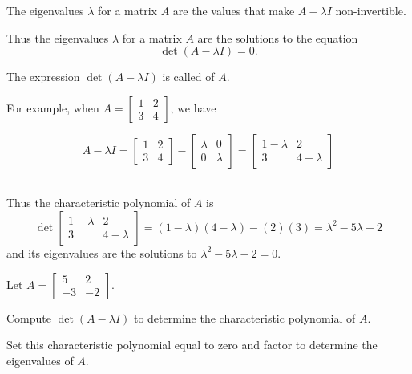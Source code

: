 \begin{fact}
  The eigenvalues \(\lambda\) for a matrix \(A\) are the values
  that make \(A-\lambda I\) non-invertible.

  \vspace{1em}

  Thus the eigenvalues \(\lambda\) for a matrix \(A\)
  are the solutions to
  the equation \[\det(A-\lambda I)=0.\]
\end{fact}

\begin{definition}
The expression \(\det(A-\lambda I)\) is called
 of \(A\). \\

\vspace{1em} 

For example, when
\(A=\begin{bmatrix}1 & 2 \\ 3 & 4\end{bmatrix}\), we have

\[
  A-\lambda I=
  \begin{bmatrix}1 & 2 \\ 3 & 4\end{bmatrix}-
  \begin{bmatrix}\lambda & 0 \\ 0 & \lambda\end{bmatrix}=
  \begin{bmatrix}1-\lambda & 2 \\ 3 & 4-\lambda\end{bmatrix}
\]

\ \\
Thus the characteristic polynomial of \(A\) is
\[
  \det\begin{bmatrix}1-\lambda & 2 \\ 3 & 4-\lambda\end{bmatrix}
=
  (1-\lambda)(4-\lambda)-(2)(3)
=
  \lambda^2-5\lambda-2
\]
and its eigenvalues are the solutions to \(\lambda^2-5\lambda-2=0\).
\end{definition}


\begin{activity}{10}
Let \(A = \begin{bmatrix} 5 & 2 \\ -3 & -2 \end{bmatrix}\).
\begin{subactivity}
Compute \(\det (A-\lambda I)\) to determine the characteristic polynomial of \(A\).
\end{subactivity}
\begin{subactivity}
Set this characteristic polynomial equal to zero and factor to determine the eigenvalues of \(A\).
\end{subactivity}
\end{activity}

